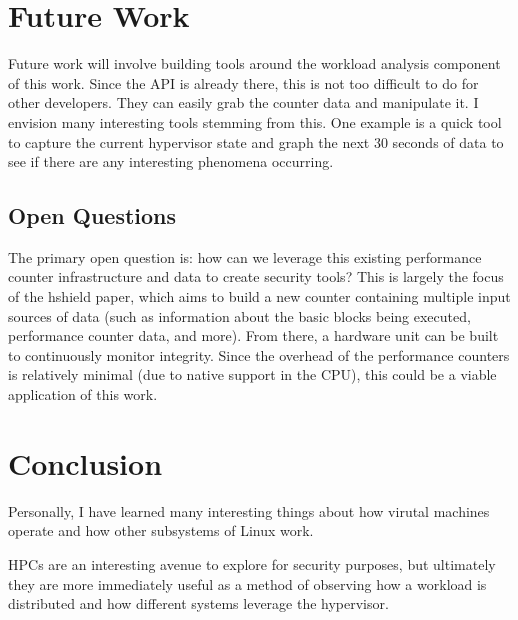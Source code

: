\documentclass[notitlepage]{article}
\begin{document}
\section{Future Work}
Future work will involve building tools around the workload analysis component
of this work. Since the API is already there, this is not too difficult to do
for other developers. They can easily grab the counter data and manipulate it. I
envision many interesting tools stemming from this. One example is a quick tool
to capture the current hypervisor state and graph the next 30 seconds of data to
see if there are any interesting phenomena occurring.

\subsection{Open Questions}
The primary open question is: how can we leverage this existing performance
counter infrastructure and data to create security tools? This is largely the
focus of the hshield %
paper, which aims to build a new counter containing multiple input sources of
data (such as information about the basic blocks being executed, performance
counter data, and more). From there, a hardware unit can be built to
continuously monitor integrity. Since the overhead of the performance counters
is relatively minimal (due to native support in the CPU), this could be a viable
application of this work.


\section{Conclusion}
Personally, I have learned many interesting things about how virutal machines
operate and how other subsystems of Linux work.

HPCs are an interesting avenue to explore for security purposes, but ultimately
they are more immediately useful as a method of observing how a workload is
distributed and how different systems leverage the hypervisor.


\newpage

\nocite{*}

{}

\end{document}
